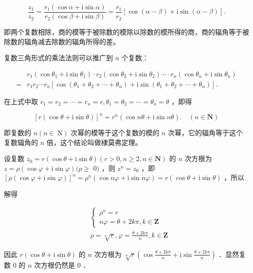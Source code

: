 \documentclass[10pt]{article}
\begin{document}
\[
\frac{z_{1}}{z_{2}}=\frac{r_{1}(\cos \alpha+\mathrm{i} \sin \alpha)}{r_{2}(\cos \beta+\mathrm{i} \sin \beta)}=\frac{r_{1}}{r_{2}}[\cos (\alpha-\beta)+\mathrm{i} \sin (\alpha-\beta)] .
\]

即两个复数相除，商的模等于被除数的模除以除数的模所得的商，商的辐角等于被除数的辐角减去除数的辐角所得的差。

复数三角形式的乘法法则可以推广到 \(n\) 个复数：

\[
\begin{aligned}
& r_{1}\left(\cos \theta_{1}+\mathrm{i} \sin \theta_{1}\right) \cdot r_{2}\left(\cos \theta_{2}+\mathrm{i} \sin \theta_{2}\right) \cdots \cdot r_{n}\left(\cos \theta_{n}+\mathrm{i} \sin \theta_{n}\right) \\
= & r_{1} r_{2} \cdots r_{n}\left[\cos \left(\theta_{1}+\theta_{2}+\cdots+\theta_{n}\right)+\mathrm{i} \sin \left(\theta_{1}+\theta_{2}+\cdots+\theta_{n}\right)\right] .
\end{aligned}
\]

在上式中取 \(r_{1}=r_{2}=\cdots=r_{n}=r, \theta_{1}=\theta_{2}=\cdots=\theta_{n}=\theta\) ，即得

\[
[r(\cos \theta+\mathrm{i} \sin \theta)]^{n}=r^{n}(\cos n \theta+\mathrm{i} \sin n \theta) . \quad(n \in \mathbf{N})
\]

即复数的 \(n(n \in \mathrm{~N})\) 次幂的模等于这个复数的模的 \(n\) 次幂，它的辐角等于这个复数辐角的 \(n\) 倍，这个结论叫做棣莫弗定理。

设复数 \(z_{0}=r(\cos \theta+\mathrm{i} \sin \theta)(r>0, n \geqslant 2, n \in \mathbf{N})\) 的 \(n\) 次方根为 \(z=\rho(\cos \varphi+\mathrm{i} \sin \varphi)(\rho \geqslant\) \(0)\) ，则 \(z^{n}=z_{0}\) ，即 \([\rho(\cos \varphi+\mathrm{i} \sin \varphi)]^{n}=\rho^{n}(\cos n \varphi+\mathrm{i} \sin n \varphi)=r(\cos \theta+\mathrm{i} \sin \theta)\) ，所以

解得

\[
\begin{aligned}
&\left\{\begin{array}{l}
\rho^{n}=r \\
n \varphi=\theta+2 k \pi, k \in \mathbf{Z}
\end{array}\right. \\
& \rho=\sqrt[n]{r}, \varphi=\frac{\theta+2 k \pi}{n}, k \in \mathbf{Z}
\end{aligned}
\]

因此 \(r(\cos \theta+\mathrm{i} \sin \theta)\) 的 \(n\) 次方根为 \(\sqrt[n]{r}\left(\cos \frac{\theta+2 k \pi}{n}+\mathrm{i} \sin \frac{\theta+2 k \pi}{n}\right)\) ．显然复数 0 的 \(n\) 次方根仍然是 0 ．
\end{document}
